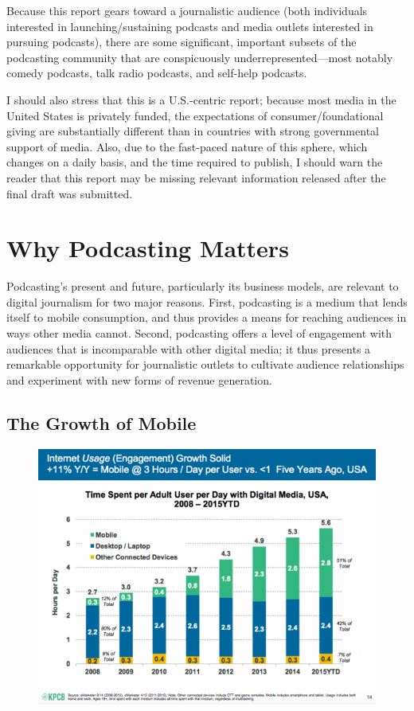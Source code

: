 \documentclass[notoc, symmetric, nobib, nols]{towcenter-guideto-book}
\begin{document}
Because this report gears toward a journalistic audience (both individuals interested in launching/sustaining podcasts and media outlets interested in pursuing podcasts), there are some significant, important subsets of the podcasting community that are conspicuously underrepresented---most notably comedy podcasts, talk radio podcasts, and self-help podcasts. 

I should also stress that this is a U.S.-centric report; because most media in the United States is privately funded, the expectations of consumer/foundational giving are substantially different than in countries with strong governmental support of media. Also, due to the fast-paced nature of this sphere, which changes on a daily basis, and the time required to publish, I should warn the reader that this report may be missing relevant information released after the final draft was submitted. 

\chapter{Why Podcasting Matters}

Podcasting's present and future, particularly its business models, are relevant to digital journalism for two major reasons. First, podcasting is a medium that lends itself to mobile consumption, and thus provides a means for reaching audiences in ways other media cannot. Second, podcasting offers a level of engagement with audiences that is incomparable with other digital media; it thus presents a remarkable opportunity for journalistic outlets to cultivate audience relationships and experiment with new forms of revenue generation.

\section{The Growth of Mobile}

\begin{figure}
\begin{centering}
\includegraphics[width=.9\textwidth]{graphics/PODCAST15_KPCB_Mobile.png}
\caption{}
\end{centering}
\end{figure}
\end{document}
